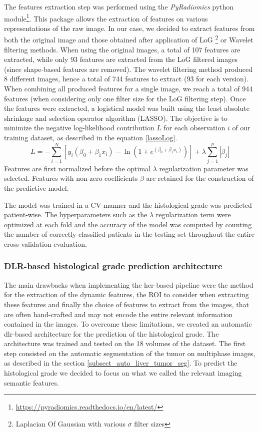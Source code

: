 The features extraction step was performed using the \textit{PyRadiomics} python module\footnote{\url{https://pyradiomics.readthedocs.io/en/latest/}}. This package allows the extraction of features on various representations of the raw image. In our case, we decided to extract features from both the original image and those obtained after application of LoG \footnote{Laplacian Of Gaussian with various $\sigma$ filter sizes} or Wavelet filtering methods. When using the original images, a total of 107 features are extracted, while only 93 features are extracted from the LoG filtered images (since shape-based features are removed). The wavelet filtering method produced 8 different images, hence a total of 744 features to extract (93 for each version). When combining all produced features for a single image, we reach a total of 944 features (when considering only one filter size for the LoG filtering step).
Once the features were extracted, a logistical model was built using the least absolute shrinkage and selection operator algorithm (LASSO). The objective is to minimize the negative log-likelihood contribution $L$ for each observation $ i $ of our training dataset, as described in the equation \ref{lassoLog}.
\begin{equation} \label{lassoLog}
L = -\sum_{i=1}^{N} \left[ y_{i} \left( {\beta}_{0} + {\beta}_{1} x_{i} \right) -\ln \left( 1+e^{({\beta}_{0} + {\beta}_{1} x_{i})} \right) \right] + \lambda \sum_{j=1}^{p} \left| {\beta}_{j} \right|
\end{equation}
Features are first normalized before the optimal $ \lambda  $ regularization parameter was selected. Features with non-zero coefficients $ \beta $ are retained for the construction of the predictive model.

The model was trained in a CV-manner and the histological grade was predicted patient-wise. The hyperparameters such as the $ \lambda $ regularization term were optimized at each fold and the accuracy of the model was computed by counting the number of correctly classified patients in the testing set throughout the entire cross-validation evaluation.

\subsubsection{DLR-based histological grade prediction architecture}\label{dlr-based_method}

The main drawbacks when implementing the \ac{hcr}-based pipeline were the method for the extraction of the dynamic features, the ROI to consider when extracting these features and finally the choice of features to extract from the images, that are often hand-crafted and may not encode the entire relevant information contained in the images.
To overcome these limitations, we created an automatic \ac{dlr}-based architecture for the prediction of the histological grade. The architecture was trained and tested on the 18 volumes of the \textbf{} dataset.
The first step consisted on the automatic segmentation of the tumor on multiphase images, as described in the section \ref{subsect_auto_liver_tumor_seg}.
To predict the histological grade we decided to focus on what we called the
relevant imaging semantic features.

